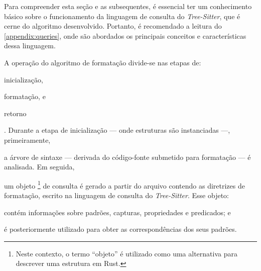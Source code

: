 \documentclass
  [11pt,a4paper,english,brazil,openright,sumario=tradicional,twoside]
  {abntex2}
\newcommand{\treesitter}{\textit{Tree-Sitter}\xspace}
\begin{document}
  Para compreender esta seção e as subsequentes, é essencial ter um
  conhecimento básico sobre o funcionamento da linguagem de consulta do
  \treesitter, que é cerne do algoritmo desenvolvido. Portanto, é recomendado a
  leitura do \cref{appendix:queries}, onde são abordados os principais
  conceitos e características dessa linguagem.

  A operação do algoritmo de formatação divide-se nas etapas de:
  \begin{inparaenum}
    \item inicialização,
    \item formatação, e
    \item retorno%
  \end{inparaenum}
  . Durante a etapa de inicialização --- onde estruturas são instanciadas ---,
  primeiramente,
  \begin{inparaenum}
    \item a árvore de sintaxe --- derivada do código-fonte submetido para
          formatação --- é analisada. Em seguida,
    \item um objeto%
          \footnote
            { Neste contexto, o termo ``objeto'' é utilizado como uma
              alternativa para descrever uma estrutura em Rust.}
          de consulta é gerado a partir do arquivo contendo as
          diretrizes de formatação, escrito na linguagem de consulta do
          \treesitter. Esse objeto:
          \begin{inparaenum}
            \item contém informações sobre padrões, capturas, propriedades e
                  predicados; e
            \item é posteriormente utilizado para obter as correspondências
                  dos seus padrões.
          \end{inparaenum}


\end{inparaenum}
\end{document}
